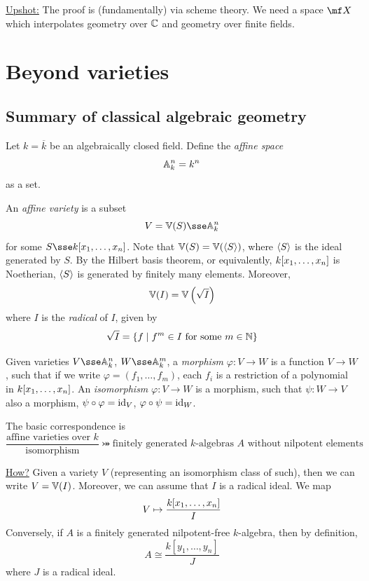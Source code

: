 \documentclass{article}
\begin{document}
\underline{Upshot:} The proof is (fundamentally) via scheme theory. We need a space \(\mf X\) which interpolates geometry over \(\mathbb{C}\) and geometry over finite fields.

\lec

\section{Beyond varieties}

\subsection{Summary of classical algebraic geometry}

Let \(k = \overline k\) be an algebraically closed field. Define the \emph{affine space}
\[\mathbb{A}_{k}^{n} = k^n\]
as a set.

An \emph{affine variety} is a subset
\[V = \van(S) \sse \aff k n\]
for some \(S \sse k\poly n\). Note that \(\mathbb{V}(S) = \mathbb{V}(\left\langle S \right\rangle)\), where \(\left\langle S \right\rangle\) is the ideal generated by \(S\). By the Hilbert basis theorem, or equivalently, \(k [x_1, \dots, x_{n}]\) is Noetherian, \(\left\langle S \right\rangle\) is generated by finitely many elements. Moreover,
\[\mathbb{V}(I) = \mathbb{V}\left(\sqrt{I}\right)\]
where \(I\) is the \emph{radical} of \(I\), given by
\[\sqrt{I} = \left\{f \mid f^m \in I \text{ for some }m \in \mathbb{N}\right\}\]

Given varieties \(V \sse \aff k n\), \(W \sse \aff k m\), a \emph{morphism} \(\varphi : V \to W\) is a function \(V \to W\), such that if we write \(\varphi = (f_1, \dots, f_m)\), each \(f_i\) is a restriction of a polynomial in \(k [x_1, \dots, x_{n}]\). An \emph{isomorphism} \(\varphi : V \to W\) is a morphism, such that \(\psi : W \to V\) also a morphism, \(\psi \circ \varphi = \operatorname{id}_V\), \(\varphi \circ \psi = \operatorname{id}_W\).

The basic correspondence is
\[\frac{\text{affine varieties over }k}{\text{isomorphism}} \bij \text{finitely generated }k\text{-algebras }A\text{ without nilpotent elements}\]

\underline{How?} Given a variety \(V\) (representing an isomorphism class of such), then we can write \(V = \mathbb{V}(I)\). Moreover, we can assume that \(I\) is a radical ideal. We map
\[V \mapsto \frac{k[x_1, \dots, x_{n}]}{I}\]
Conversely, if \(A\) is a finitely generated nilpotent-free \(k\)-algebra, then by definition,
\[A \cong \frac{k[y_1, \dots, y_n]}{J}\]
where \(J\) is a radical ideal.
\end{document}
